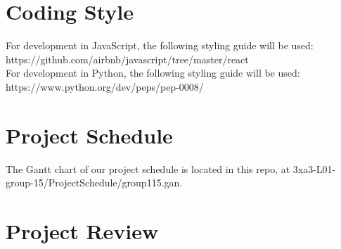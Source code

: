 \documentclass{article}
\begin{document}
\section{Coding Style}
For development in JavaScript, the following styling guide will be used:\\
https://github.com/airbnb/javascript/tree/master/react \\
For development in Python, the following styling guide will be used:\\ 
https://www.python.org/dev/peps/pep-0008/ \\

\section{Project Schedule}

The Gantt chart of our project schedule is located in this repo, at 3xa3-L01-group-15/ProjectSchedule/group115.gan.

\section{Project Review}
\end{document}
